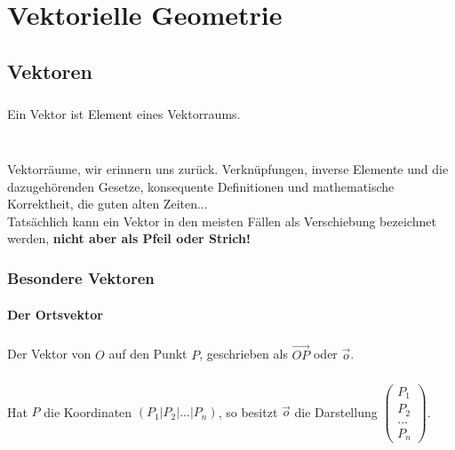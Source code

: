 \chapter{Vektorielle Geometrie}


\section{Vektoren}

\paragraph{} Ein Vektor ist Element eines Vektorraums.\\ \\
\paragraph{} Vektorräume, wir erinnern uns zurück. Verknüpfungen, inverse Elemente und die dazugehörenden Gesetze, konsequente Definitionen und mathematische Korrektheit, die guten alten Zeiten...\\
Tatsächlich kann ein Vektor in den meisten Fällen als Verschiebung bezeichnet werden, \textbf{nicht aber als Pfeil oder Strich!}\\

\subsection{Besondere Vektoren}

\subsubsection{Der Ortsvektor}

\paragraph{} Der Vektor von $O$ auf den Punkt $P$, geschrieben als $\vec{OP}$ oder $\vec{o}$.\\
\paragraph{} Hat $P$ die Koordinaten $(P_1|P_2|...|P_n)$, so besitzt $\vec{o}$ die Darstellung $\left(\begin{array}{c} P_1 \\ P_2 \\ ...\\P_n\end{array}\right)$.
